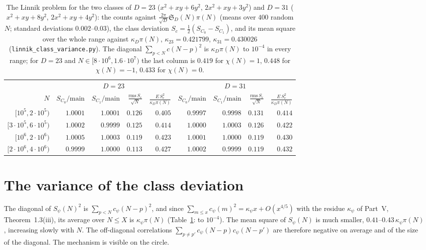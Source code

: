 ﻿\documentclass[11pt]{amsart}
\theoremstyle{remark}
\newcommand{\sS}{\mathfrak S}
\begin{document}
\begin{table}[htbp]
\centering\footnotesize\setlength{\tabcolsep}{5pt}
\begin{tabular}{r|rrrr|rrrr}
\toprule
 & \multicolumn{4}{c|}{$D=23$} & \multicolumn{4}{c}{$D=31$}\\
$N$ & $S_{C_0}/\mathrm{main}$ & $S_{C_1}/\mathrm{main}$ & $\frac{\mathrm{rms}\,S_c}{\sqrt N}$ & $\frac{E\,S_c^2}{\kappa_D\pi(N)}$ & $S_{C_0}/\mathrm{main}$ & $S_{C_1}/\mathrm{main}$ & $\frac{\mathrm{rms}\,S_c}{\sqrt N}$ & $\frac{E\,S_c^2}{\kappa_D\pi(N)}$\\
\midrule
$[10^5,2\cdot10^5)$ & $1.0001$ & $1.0001$ & $0.126$ & $0.405$ & $0.9997$ & $0.9998$ & $0.131$ & $0.414$\\
$[3\cdot10^5,6\cdot10^5)$ & $1.0002$ & $0.9999$ & $0.125$ & $0.414$ & $1.0000$ & $1.0003$ & $0.126$ & $0.422$\\
$[10^6,2\cdot10^6)$ & $1.0005$ & $1.0003$ & $0.119$ & $0.423$ & $1.0001$ & $1.0000$ & $0.119$ & $0.430$\\
$[2\cdot10^6,4\cdot10^6)$ & $0.9999$ & $1.0000$ & $0.113$ & $0.427$ & $1.0002$ & $0.9999$ & $0.119$ & $0.432$\\
\bottomrule
\end{tabular}
\medskip
\caption{The Linnik problem for the two classes of $D=23$ ($x^2+xy+6y^2$, $2x^2+xy+3y^2$) and $D=31$ ($x^2+xy+8y^2$, $2x^2+xy+4y^2$): the counts against $\frac{2\pi}{\sqrt D}\sS_D(N)\pi(N)$ (means over $400$ random $N$; standard deviations $0.002$--$0.03$), the class deviation $S_c=\frac12(S_{C_0}-S_{C_1})$, and its mean square over the whole range against $\kappa_D\pi(N)$, $\kappa_{23}=0.421799$, $\kappa_{31}=0.430026$ (\texttt{linnik\_class\_variance.py}). The diagonal $\sum_{p<N}c(N-p)^2$ is $\kappa_D\pi(N)$ to $10^{-4}$ in every range; for $D=23$ and $N\in[8\cdot10^6,1.6\cdot10^7)$ the last column is $0.419$ for $\chi(N)=1$, $0.448$ for $\chi(N)=-1$, $0.433$ for $\chi(N)=0$.}
\label{tab:ratios}
\end{table}

\section{The variance of the class deviation}
The diagonal of $S_\psi(N)^2$ is $\sum_{p<N}c_\psi(N-p)^2$, and since $\sum_{m\le x}c_\psi(m)^2=\kappa_\psi x+O(x^{4/5})$ with the residue $\kappa_\psi$ of Part~V, Theorem~1.3(iii), its average over $N\le X$ is $\kappa_\psi\pi(N)$ (Table~\ref{tab:ratios}: to $10^{-4}$). The mean square of $S_\psi(N)$ is much smaller, $0.41$--$0.43\,\kappa_\psi\pi(N)$, increasing slowly with $N$. The off-diagonal correlations $\sum_{p\ne p'}c_\psi(N-p)c_\psi(N-p')$ are therefore negative on average and of the size of the diagonal. The mechanism is visible on the circle.
\end{document}
